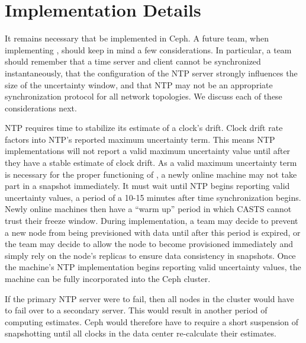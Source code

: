 \chapter{Implementation Details}
\label{sec:impl}

It remains necessary that \alg be implemented in Ceph. 
A future team, when implementing \alg, should keep in 
mind a few considerations. In particular, a team should 
remember that a time server and client cannot be 
synchronized instantaneously, that the configuration 
of the NTP server strongly influences the size of the 
uncertainty window, and that NTP may not be an 
appropriate synchronization protocol for all network topologies. We discuss
each of these considerations next.

NTP requires time to stabilize its estimate of a clock's drift.
Clock drift rate factors into NTP's reported maximum uncertainty
term. This means NTP implementations will not report a 
valid maximum uncertainty value
until after they have a stable estimate of clock drift.
As a valid maximum uncertainty term is necessary for the proper 
functioning of \alg, a newly online machine may not take part in
a snapshot immediately. It must wait until NTP begins reporting 
valid uncertainty values, a period of a 10-15 minutes after 
time synchronization begins. Newly online machines then have a
``warm up'' period in which CASTS cannot trust their freeze
window. During implementation, a team may decide to prevent 
a new node from being previsioned with data until after this period 
is expired, or the team may decide to allow the node to 
become provisioned immediately and simply rely on the node's 
replicas to ensure data consistency in snapshots. Once 
the machine's NTP implementation begins reporting
valid uncertainty values, the machine can be fully
incorporated into the Ceph cluster.

If the primary NTP server were to fail, then all nodes in the
cluster would have to fail over to a secondary server.
This would result in another period of computing estimates. 
Ceph would therefore
have to require a short suspension of snapshotting until all clocks in
the data center re-calculate their estimates.

